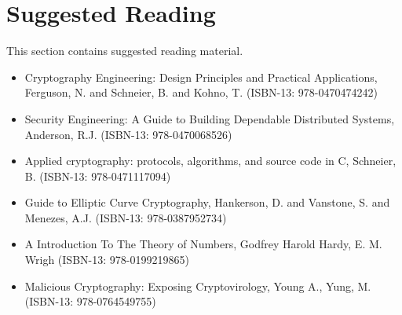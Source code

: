 \section{Suggested Reading}
\label{section:Suggested_Reading}
This section contains suggested reading material.

\begin{itemize}
	\item Cryptography Engineering: Design Principles and Practical Applications, Ferguson, N. and Schneier, B. and Kohno, T. (ISBN-13: 978-0470474242)
	\item Security Engineering: A Guide to Building Dependable Distributed Systems, Anderson, R.J. (ISBN-13: 978-0470068526)
	\item Applied cryptography: protocols, algorithms, and source code in C, Schneier, B. (ISBN-13: 978-0471117094)
	\item Guide to Elliptic Curve Cryptography, Hankerson, D. and Vanstone, S. and Menezes, A.J. (ISBN-13: 978-0387952734)
	\item A Introduction To The Theory of Numbers, Godfrey Harold Hardy, E. M. Wrigh (ISBN-13: 978-0199219865)
	\item Malicious Cryptography: Exposing Cryptovirology, Young A., Yung, M. (ISBN-13: 978-0764549755)
\end{itemize}

